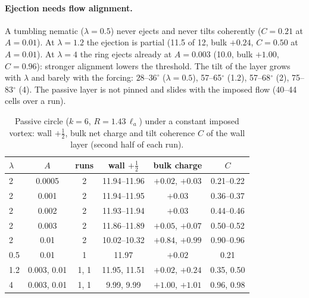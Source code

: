 \documentclass[aps,prl,onecolumn,superscriptaddress,amsmath,amssymb,nofootinbib]{revtex4-2}
\newcommand{\half}{\tfrac12}
\newcommand{\la}{\ell_a}
\begin{document}
\paragraph{Ejection needs flow alignment.} A tumbling nematic ($\lambda=0.5$) never ejects and never tilts coherently ($C=0.21$ at $A=0.01$). At $\lambda=1.2$ the ejection is
partial (11.5 of 12, bulk $+0.24$, $C=0.50$ at $A=0.01$). At $\lambda=4$ the ring ejects already at $A=0.003$ (10.0, bulk $+1.00$, $C=0.96$): stronger alignment lowers the
threshold. The tilt of the layer grows with $\lambda$ and barely with the forcing: $28$--$36^\circ$ ($\lambda=0.5$), 57--65$^\circ$ (1.2), 57--68$^\circ$ (2), 75--83$^\circ$ (4).
The passive layer is not pinned and slides with the imposed flow (40--44 cells over a run).
\begin{table}[h]\centering\small
\caption{Passive circle ($k=6$, $R=1.43\,\la$) under a constant imposed vortex: wall $+\half$, bulk net charge and tilt coherence $C$ of the wall layer (second half of
each run).}\label{tab:s_swirl}
\begin{tabular}{lccccc}\hline
$\lambda$ & $A$ & runs & wall $+\half$ & bulk charge & $C$\\\hline
2 & 0.0005 & 2 & 11.94--11.96 & $+0.02$, $+0.03$ & 0.21--0.22\\
2 & 0.001 & 2 & 11.94--11.95 & $+0.03$ & 0.36--0.37\\
2 & 0.002 & 2 & 11.93--11.94 & $+0.03$ & 0.44--0.46\\
2 & 0.003 & 2 & 11.86--11.89 & $+0.05$, $+0.07$ & 0.50--0.52\\
2 & 0.01 & 2 & 10.02--10.32 & $+0.84$, $+0.99$ & 0.90--0.96\\
0.5 & 0.01 & 1 & 11.97 & $+0.02$ & 0.21\\
1.2 & 0.003, 0.01 & 1, 1 & 11.95, 11.51 & $+0.02$, $+0.24$ & 0.35, 0.50\\
4 & 0.003, 0.01 & 1, 1 & 9.99, 9.99 & $+1.00$, $+1.01$ & 0.96, 0.98\\\hline
\end{tabular}\end{table}
\end{document}

